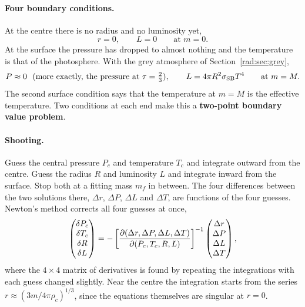 \paragraph{Four boundary conditions.} At the centre there is no radius and no luminosity yet,
\begin{equation}
	r=0,\qquad L=0\qquad\text{at }m=0.
\end{equation}
At the surface the pressure has dropped to almost nothing and the temperature is that of the photosphere. With the grey atmosphere of Section~\ref{rad:sec:grey},
\begin{equation}
	P\approx0\ \ (\text{more exactly, the pressure at }\tau=\tfrac23),\qquad L=4\pi R^2\sigma_{\rm SB}T^4\qquad\text{at }m=M.
\end{equation}
The second surface condition says that the temperature at $m=M$ is the effective temperature. Two conditions at each end make this a \textbf{two-point boundary value problem}.

\paragraph{Shooting.} Guess the central pressure $P_c$ and temperature $T_c$ and integrate outward from the centre. Guess the radius $R$ and luminosity $L$ and integrate inward from the surface. Stop both at a fitting mass $m_f$ in between. The four differences between the two solutions there, $\Delta r$, $\Delta P$, $\Delta L$ and $\Delta T$, are functions of the four guesses. Newton's method corrects all four guesses at once,
\begin{equation}
	\begin{pmatrix}\delta P_c\\ \delta T_c\\ \delta R\\ \delta L\end{pmatrix}
	=-\left[\pdv{(\Delta r,\Delta P,\Delta L,\Delta T)}{(P_c,T_c,R,L)}\right]^{-1}
	\begin{pmatrix}\Delta r\\ \Delta P\\ \Delta L\\ \Delta T\end{pmatrix},
\end{equation}
where the $4\times4$ matrix of derivatives is found by repeating the integrations with each guess changed slightly. Near the centre the integration starts from the series $r\approx(3m/4\pi\rho_c)^{1/3}$, since the equations themselves are singular at $r=0$.

